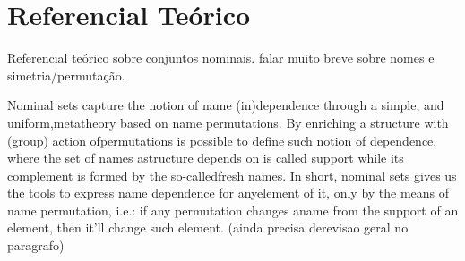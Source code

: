\chapter{Referencial Teórico}\label{chp:ref-teorico}

Referencial teórico sobre conjuntos nominais. falar muito breve sobre nomes e simetria/permutação.

Nominal sets capture the notion of name (in)dependence through a simple, and uniform,metatheory based on name permutations. By enriching a structure with (group) action ofpermutations is possible to define such notion of dependence, where the set of names astructure depends on is called support while its complement is formed by the so-calledfresh names. In short, nominal sets gives us the tools to express name dependence for anyelement of it, only by the means of name permutation, i.e.: if any permutation changes aname from the support of an element, then it’ll change such element.  (ainda precisa derevisao geral no paragrafo)

